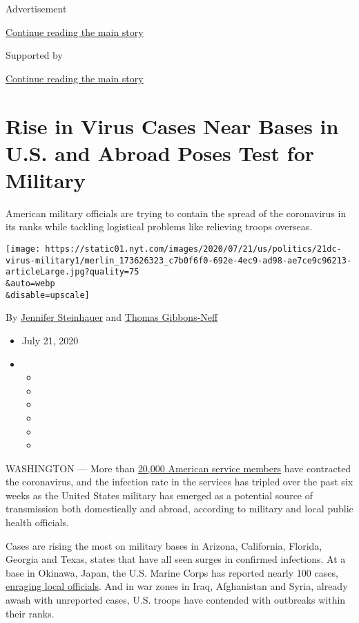 Advertisement

\protect\hyperlink{after-top}{Continue reading the main story}

Supported by

\protect\hyperlink{after-sponsor}{Continue reading the main story}

\hypertarget{rise-in-virus-cases-near-bases-in-us-and-abroad-poses-test-for-military}{%
\section{Rise in Virus Cases Near Bases in U.S. and Abroad Poses Test
for
Military}\label{rise-in-virus-cases-near-bases-in-us-and-abroad-poses-test-for-military}}

American military officials are trying to contain the spread of the
coronavirus in its ranks while tackling logistical problems like
relieving troops overseas.

\texttt{[image: https://static01.nyt.com/images/2020/07/21/us/politics/21dc-virus-military1/merlin\_173626323\_c7b0f6f0-692e-4ec9-ad98-ae7ce9c96213-articleLarge.jpg?quality=75\\\&auto=webp\\\&disable=upscale]}

By \href{https://www.nytimes.com/by/jennifer-steinhauer}{Jennifer
Steinhauer} and
\href{https://www.nytimes.com/by/thomas-gibbons-neff}{Thomas
Gibbons-Neff}

\begin{itemize}
\item
  July 21, 2020
\item
  \begin{itemize}
  \item
  \item
  \item
  \item
  \item
  \item
  \end{itemize}
\end{itemize}

WASHINGTON --- More than
\href{https://www.defense.gov/explore/spotlight/coronavirus/}{20,000
American service members} have contracted the coronavirus, and the
infection rate in the services has tripled over the past six weeks as
the United States military has emerged as a potential source of
transmission both domestically and abroad, according to military and
local public health officials.

Cases are rising the most on military bases in Arizona, California,
Florida, Georgia and Texas, states that have all seen surges in
confirmed infections. At a base in Okinawa, Japan, the U.S. Marine Corps
has reported nearly 100 cases,
\href{https://www.nytimes.com/2020/07/13/world/asia/coronavirus-military-okinawa.html}{enraging
local officials}. And in war zones in Iraq, Afghanistan and Syria,
already awash with unreported cases, U.S. troops have contended with
outbreaks within their ranks.

